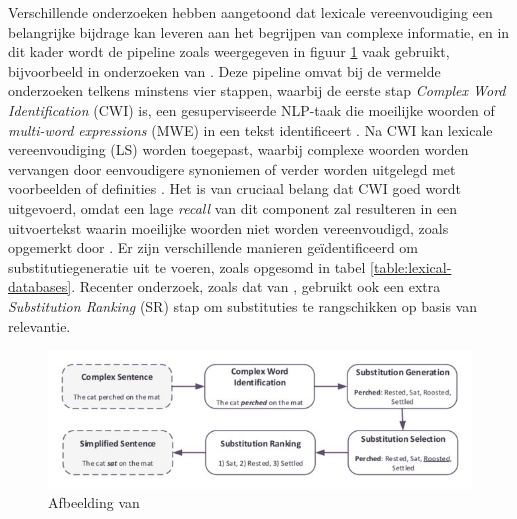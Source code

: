 \medspace

Verschillende onderzoeken hebben aangetoond dat lexicale vereenvoudiging een belangrijke bijdrage kan leveren aan het begrijpen van complexe informatie, en in dit kader wordt de pipeline zoals weergegeven in figuur \ref{img:pipeline-lexical-simplification} vaak gebruikt, bijvoorbeeld in onderzoeken van \textcite{Paetzold2016, Bingel2018, Bulte2018}. Deze pipeline omvat bij de vermelde onderzoeken telkens minstens vier stappen, waarbij de eerste stap \textit{Complex Word Identification} (CWI) is, een gesuperviseerde NLP-taak die moeilijke woorden of \textit{multi-word expressions} (MWE) in een tekst identificeert \autocite{Shardlow2013, Gooding2019}. Na CWI kan lexicale vereenvoudiging (LS) worden toegepast, waarbij complexe woorden worden vervangen door eenvoudigere synoniemen of verder worden uitgelegd met voorbeelden of definities \autocite{Zeng2005, Kandula2010}. Het is van cruciaal belang dat CWI goed wordt uitgevoerd, omdat een lage \textit{recall} van dit component zal resulteren in een uitvoertekst waarin moeilijke woorden niet worden vereenvoudigd, zoals opgemerkt door \textcite{Shardlow2013}. Er zijn verschillende manieren geïdentificeerd om substitutiegeneratie uit te voeren, zoals opgesomd in tabel \ref{table:lexical-databases}. Recenter onderzoek, zoals dat van \textcite{Zhou2019}, gebruikt ook een extra \textit{Substitution Ranking} (SR) stap om substituties te rangschikken op basis van relevantie. 

\begin{figure}[H]
	\includegraphics{img/lexical-simplification-pipeline.png}
	\caption{Afbeelding van \textcite{Althunayyan2021}}
	\label{img:pipeline-lexical-simplification}
\end{figure}

